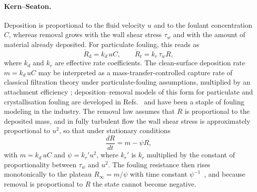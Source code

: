 \documentclass[preprint,12pt]{elsarticle}
\begin{document}
\paragraph*{Kern--Seaton.}
Deposition is proportional to the fluid velocity
$u$ and to the foulant concentration $C$, 
whereas removal grows with the wall
shear stress $\tau_w$ and with the amount of material already deposited. For particulate fouling, this reads as
\begin{equation}
  \dot R_{\mathrm d}=k_d\,uC,\qquad \dot R_{\mathrm r}=k_r\,\tau_w R,
  \label{eq:kern_seaton_rates}
\end{equation}
where $k_d$ and $k_r$ are effective rate coefficients. The clean-surface
deposition rate $m=k_d\,uC$ may be interpreted as a mass-transfer-controlled
capture rate of classical filtration theory under particulate-fouling
assumptions, multiplied by an attachment efficiency
\cite{Yao1971,Epstein1988}; deposition--removal models of this form for
particulate and crystallisation fouling are developed in 
Refs.~\cite{Bohnet1987,Kostoglou1998} and have been a staple of fouling modeling 
in the industry.
The removal law
assumes that $R$ is proportional to the deposited mass, and in fully
turbulent flow the wall shear stress is approximately proportional to $u^{2}$,
so that under stationary conditions 
\begin{equation}
  \frac{dR}{dt}=m-\psi R,
\end{equation}
with $m=k_d\,uC$ and
$\psi=k_r'u^{2}$, where $k_r'$ is $k_r$ multiplied by the constant of
proportionality between $\tau_w$ and $u^{2}$. The fouling resistance then rises monotonically to the
plateau $R_\infty=m/\psi$ with time constant
$\psi^{-1}$~\cite{KernSeaton1959,MullerSteinhagen2011}, and because removal is
proportional to $R$ the state cannot become negative.
\end{document}
